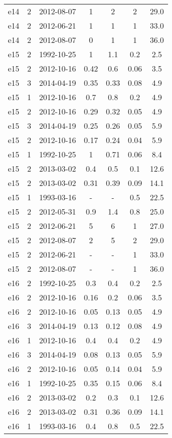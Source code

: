 \begin{table*}[htp]
\begin{tabular}{ccccccc}
e14 & 2 & 2012-08-07 & 1 & 2 & 2 & 29.0 \\
e14 & 2 & 2012-06-21 & 1 & 1 & 1 & 33.0 \\
e14 & 2 & 2012-08-07 & 0 & 1 & 1 & 36.0 \\
e15 & 2 & 1992-10-25 & 1 & 1.1 & 0.2 & 2.5 \\
e15 & 2 & 2012-10-16 & 0.42 & 0.6 & 0.06 & 3.5 \\
e15 & 3 & 2014-04-19 & 0.35 & 0.33 & 0.08 & 4.9 \\
e15 & 1 & 2012-10-16 & 0.7 & 0.8 & 0.2 & 4.9 \\
e15 & 2 & 2012-10-16 & 0.29 & 0.32 & 0.05 & 4.9 \\
e15 & 3 & 2014-04-19 & 0.25 & 0.26 & 0.05 & 5.9 \\
e15 & 2 & 2012-10-16 & 0.17 & 0.24 & 0.04 & 5.9 \\
e15 & 1 & 1992-10-25 & 1 & 0.71 & 0.06 & 8.4 \\
e15 & 2 & 2013-03-02 & 0.4 & 0.5 & 0.1 & 12.6 \\
e15 & 2 & 2013-03-02 & 0.31 & 0.39 & 0.09 & 14.1 \\
e15 & 1 & 1993-03-16 & - & - & 0.5 & 22.5 \\
e15 & 2 & 2012-05-31 & 0.9 & 1.4 & 0.8 & 25.0 \\
e15 & 2 & 2012-06-21 & 5 & 6 & 1 & 27.0 \\
e15 & 2 & 2012-08-07 & 2 & 5 & 2 & 29.0 \\
e15 & 2 & 2012-06-21 & - & - & 1 & 33.0 \\
e15 & 2 & 2012-08-07 & - & - & 1 & 36.0 \\
e16 & 2 & 1992-10-25 & 0.3 & 0.4 & 0.2 & 2.5 \\
e16 & 2 & 2012-10-16 & 0.16 & 0.2 & 0.06 & 3.5 \\
e16 & 2 & 2012-10-16 & 0.05 & 0.13 & 0.05 & 4.9 \\
e16 & 3 & 2014-04-19 & 0.13 & 0.12 & 0.08 & 4.9 \\
e16 & 1 & 2012-10-16 & 0.4 & 0.4 & 0.2 & 4.9 \\
e16 & 3 & 2014-04-19 & 0.08 & 0.13 & 0.05 & 5.9 \\
e16 & 2 & 2012-10-16 & 0.05 & 0.14 & 0.04 & 5.9 \\
e16 & 1 & 1992-10-25 & 0.35 & 0.15 & 0.06 & 8.4 \\
e16 & 2 & 2013-03-02 & 0.2 & 0.3 & 0.1 & 12.6 \\
e16 & 2 & 2013-03-02 & 0.31 & 0.36 & 0.09 & 14.1 \\
e16 & 1 & 1993-03-16 & 0.4 & 0.8 & 0.5 & 22.5 \\

\end{tabular}
\end{table*}
